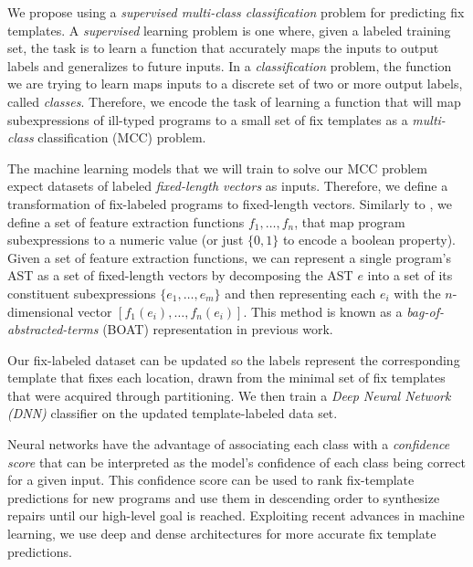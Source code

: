 We propose using a \emph{supervised multi-class classification} problem for
predicting fix templates. A \emph{supervised} learning problem is one where,
given a labeled training set, the task is to learn a function that accurately
maps the inputs to output labels and generalizes to future inputs. In a
\emph{classification} problem, the function we are trying to learn maps inputs
to a discrete set of two or more output labels, called \emph{classes}.
Therefore, we encode the task of learning a function that will map
subexpressions of ill-typed programs to a small set of fix templates as a
\emph{multi-class} classification (MCC) problem.

 The machine learning models that we will train
to solve our MCC problem expect datasets of labeled \emph{fixed-length vectors}
as inputs. Therefore, we define a transformation of fix-labeled programs to
fixed-length vectors. Similarly to \citep{Seidel:2017}, we define a set of
feature extraction functions $f_1, \ldots, f_n$, that map program subexpressions
to a numeric value (or just $\{0, 1\}$ to encode a boolean property). Given a
set of feature extraction functions, we can represent a single program's AST as
a set of fixed-length vectors by decomposing the AST $e$ into a set of its
constituent subexpressions $\{e_1, \ldots, e_m\}$ and then representing each
$e_i$ with the $n$-dimensional vector $[f_1(e_i), \ldots, f_n(e_i)]$. This
method is known as a \emph{bag-of-abstracted-terms} (BOAT) representation in
previous work. %

Our fix-labeled dataset can be updated so the labels represent the corresponding
template that fixes each location, drawn from the minimal set of fix templates
that were acquired through partitioning. We then train a \emph{Deep Neural
Network (DNN)} classifier on the updated template-labeled data set.

Neural networks have the advantage of associating each class with a
\emph{confidence score} that can be interpreted as the model's confidence of
each class being correct for a given input. This confidence score can be used to
rank fix-template predictions for new programs and use them in descending order
to synthesize repairs until our high-level goal is reached. %
Exploiting recent advances in machine learning, we use deep and dense 
architectures \citep{Schmidhuber_2015} for more accurate fix template predictions.

